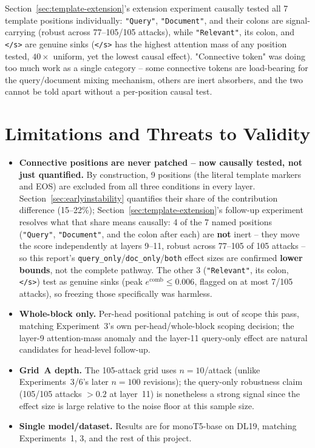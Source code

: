 \documentclass[11pt]{article}
\newcommand{\comb}{\ensuremath{e^{\mathrm{comb}}}}
\begin{document}
\begin{enumerate}
  Section~\ref{sec:template-extension}'s extension experiment causally
  tested all 7 template positions individually: \texttt{"Query"},
  \texttt{"Document"}, and their colons are signal-carrying (robust across
  77--105/105 attacks), while \texttt{"Relevant"}, its colon, and
  \texttt{</s>} are genuine sinks (\texttt{</s>} has the highest attention
  mass of any position tested, $40\times$ uniform, yet the lowest causal
  effect). "Connective token" was doing too much work as a single category
  -- some connective tokens are load-bearing for the query/document mixing
  mechanism, others are inert absorbers, and the two cannot be told apart
  without a per-position causal test.
\end{enumerate}

\section{Limitations and Threats to Validity}

\begin{itemize}
  \item \textbf{Connective positions are never patched -- now causally
  tested, not just quantified.} By construction, 9 positions (the literal
  template markers and EOS) are excluded from all three conditions in every
  layer. Section~\ref{sec:earlyinstability} quantifies their share of the
  contribution difference (15--22\%); Section~\ref{sec:template-extension}'s
  follow-up experiment resolves what that share means causally: 4 of the 7
  named positions (\texttt{"Query"}, \texttt{"Document"}, and the colon
  after each) are \textbf{not} inert -- they move the score independently
  at layers 9--11, robust across 77--105 of 105 attacks -- so this report's
  \texttt{query\_only}/\texttt{doc\_only}/\texttt{both} effect sizes are
  confirmed \textbf{lower bounds}, not the complete pathway. The other 3
  (\texttt{"Relevant"}, its colon, \texttt{</s>}) test as genuine sinks
  (peak $\comb \le 0.006$, flagged on at most 7/105 attacks), so freezing
  those specifically was harmless.
  \item \textbf{Whole-block only.} Per-head positional patching is out of
  scope this pass, matching Experiment~3's own per-head/whole-block
  scoping decision; the layer-9 attention-mass anomaly and the layer-11
  query-only effect are natural candidates for head-level follow-up.
  \item \textbf{Grid~A depth.} The 105-attack grid uses $n=10$/attack
  (unlike Experiments~3/6's later $n=100$ revisions); the query-only
  robustness claim (105/105 attacks $>0.2$ at layer~11) is nonetheless a
  strong signal since the effect size is large relative to the noise floor
  at this sample size.
  \item \textbf{Single model/dataset.} Results are for monoT5-base on
  DL19, matching Experiments~1, 3, and the rest of this project.
\end{itemize}
\end{document}
